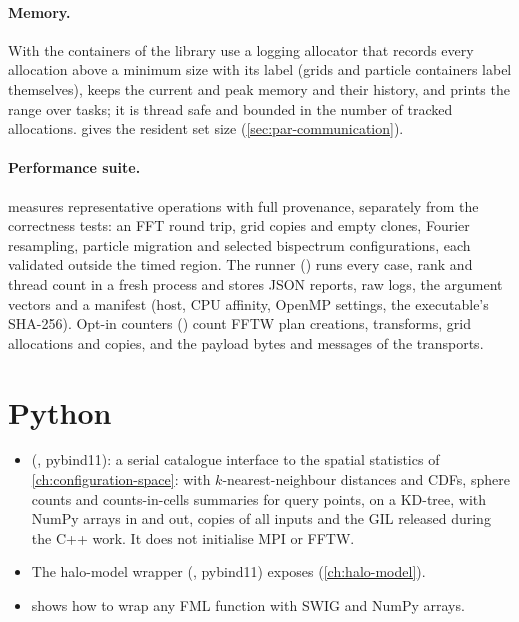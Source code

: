 \paragraph*{Memory.} With  the containers of the library use a logging allocator that records every allocation above a
minimum size with its label (grids and particle containers label themselves), keeps the current and peak memory and their history, and
prints the range over tasks; it is thread safe and bounded in the number of tracked allocations.  gives the resident
set size (\cref{sec:par-communication}).

\paragraph*{Performance suite.}  measures representative operations with full provenance, separately from the
correctness tests: an FFT round trip, grid copies and empty clones, Fourier resampling, particle migration and selected bispectrum
configurations, each validated outside the timed region. The runner () runs every case, rank and thread count in a fresh
process and stores JSON reports, raw logs, the argument vectors and a manifest (host, CPU affinity, OpenMP settings, the executable's
SHA-256). Opt-in counters () count FFTW plan creations, transforms, grid allocations and copies, and
the payload bytes and messages of the transports.

\section{Python}\label{sec:io-python}

\begin{itemize}
\item {} (, pybind11): a serial catalogue interface to the spatial statistics of
      \cref{ch:configuration-space}:  with $k$-nearest-neighbour distances and CDFs, sphere counts and
      counts-in-cells summaries for query points, on a KD-tree, with NumPy arrays in and out, copies of all inputs and the GIL released during
      the C++ work. It does not initialise MPI or FFTW.
\item The halo-model wrapper (, pybind11) exposes  (\cref{ch:halo-model}).
\item {} shows how to wrap any FML function with SWIG and NumPy arrays.
\end{itemize}

